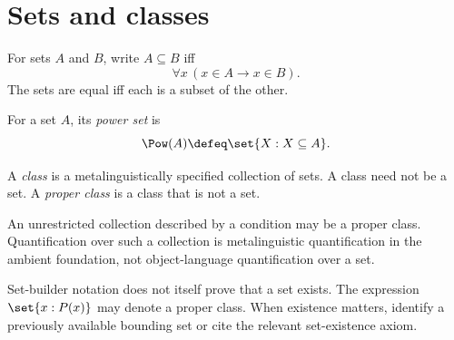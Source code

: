 \section{Sets and classes}
\label{sec:set-prerequisites-01}

\begin{definition}[Subset]
For sets \(A\) and \(B\), write \(A\subseteq B\) iff
\[
  \forall x\,(x\in A\to x\in B).
\]
The sets are equal iff each is a subset of the other.
\end{definition}

\begin{definition}
For a set \(A\), its \emph{power set} is
\[
  \Pow(A)\defeq\set{X:X\subseteq A}.
\]
\end{definition}

\begin{definition}[Class]
A \emph{class} is a metalinguistically specified collection of sets.  A class
need not be a set.  A \emph{proper class} is a class that is not a set.
\end{definition}

An unrestricted collection described by a condition may be a proper class.
Quantification over such a collection is metalinguistic quantification in the
ambient foundation, not object-language quantification over a set.

\begin{warning}
Set-builder notation does not itself prove that a set exists.  The expression
\(\set{x:P(x)}\) may denote a proper class.  When existence matters, identify a
previously available bounding set or cite the relevant set-existence axiom.
\end{warning}

